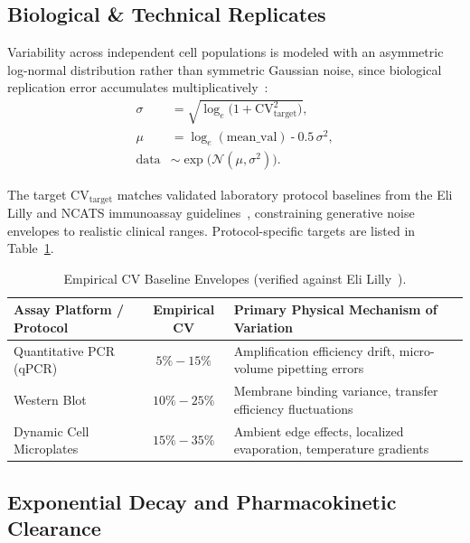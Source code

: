 \documentclass[11pt,twocolumn]{article}
\newcommand{\N}{\mathcal{N}}
\begin{document}
\subsection{Biological \& Technical Replicates}\label{sec:replicates}

Variability across independent cell populations is modeled with an asymmetric log-normal distribution rather than symmetric Gaussian noise, since biological replication error accumulates multiplicatively~\cite{limpert2001lognormal}:
\begin{align}
  \sigma &= \sqrt{\log_e\bigl(1 + \text{CV}_{\text{target}}^2\bigr)}, \label{eq:lognorm_sigma}\\
  \mu &= \log_e(\text{mean\_val}) \mathbin{\text{-}} 0.5\,\sigma^2, \label{eq:lognorm_mu}\\
  \text{data} &\sim \exp\bigl(\N(\mu, \sigma^2)\bigr). \label{eq:lognorm}
\end{align}

The target $\text{CV}_{\text{target}}$ matches validated laboratory protocol baselines from the Eli Lilly and NCATS immunoassay guidelines~\cite{lilly2012immunoassay}, constraining generative noise envelopes to realistic clinical ranges. Protocol-specific targets are listed in Table~\ref{tab:cv_baselines}.

\begin{table}[t]
\centering
\caption{Empirical CV Baseline Envelopes (verified against Eli Lilly~\cite{lilly2012immunoassay}).}\label{tab:cv_baselines}
\small
\begin{tabularx}{\textwidth}{l c X}
\toprule
\textbf{Assay Platform / Protocol} & \textbf{Empirical CV} & \textbf{Primary Physical Mechanism of Variation} \\
\midrule
Quantitative PCR (qPCR) & $5\% - 15\%$ & Amplification efficiency drift, micro-volume pipetting errors \\
Western Blot & $10\% - 25\%$ & Membrane binding variance, transfer efficiency fluctuations \\
Dynamic Cell Microplates & $15\% - 35\%$ & Ambient edge effects, localized evaporation, temperature gradients \\
\bottomrule
\end{tabularx}
\end{table}

\subsection{Exponential Decay and Pharmacokinetic Clearance}\label{sec:decay}
\end{document}

